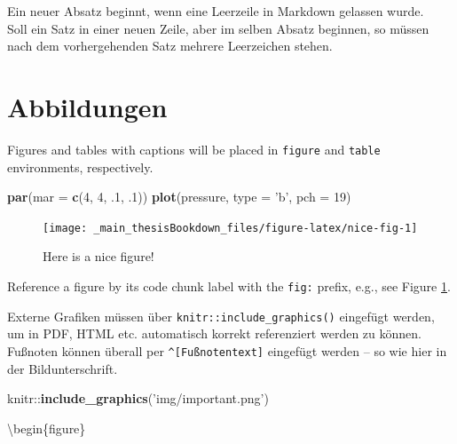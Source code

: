 \documentclass[]{book}
\makeatletter
\newenvironment{Shaded}{\begin{snugshade}}{\end{snugshade}}
\newcommand{\KeywordTok}[1]{\textcolor[rgb]{0.13,0.29,0.53}{\textbf{{#1}}}}
\newcommand{\DataTypeTok}[1]{\textcolor[rgb]{0.13,0.29,0.53}{{#1}}}
\newcommand{\DecValTok}[1]{\textcolor[rgb]{0.00,0.00,0.81}{{#1}}}
\newcommand{\StringTok}[1]{\textcolor[rgb]{0.31,0.60,0.02}{{#1}}}
\newcommand{\NormalTok}[1]{{#1}}
\newenvironment{kframe}{%
\medskip{}
\setlength{\fboxsep}{.8em}
 \def\at@end@of@kframe{}%
 \ifinner\ifhmode%
  \def\at@end@of@kframe{\end{minipage}}%
  \begin{minipage}{\columnwidth}%
 \fi\fi%
 \def\FrameCommand##1{\hskip\@totalleftmargin \hskip-\fboxsep
 \colorbox{shadecolor}{##1}\hskip-\fboxsep
     \hskip-\linewidth \hskip-\@totalleftmargin \hskip\columnwidth}%
 \MakeFramed {\advance\hsize-\width
   \@totalleftmargin\z@ \linewidth\hsize
   \@setminipage}}%
 {\par\unskip\endMakeFramed%
 \at@end@of@kframe}
\renewenvironment{Shaded}{\begin{kframe}}{\end{kframe}}
\theoremstyle{definition}
\theoremstyle{definition}
\theoremstyle{remark}
\makeatother
\begin{document}
Ein neuer Absatz beginnt, wenn eine Leerzeile in Markdown gelassen
wurde.\\
Soll ein Satz in einer neuen Zeile, aber im selben Absatz beginnen, so
müssen nach dem vorhergehenden Satz mehrere Leerzeichen stehen.

\section{Abbildungen}\label{abbildungen}

Figures and tables with captions will be placed in \texttt{figure} and
\texttt{table} environments, respectively.

\begin{Shaded}
\begin{Highlighting}[]
\KeywordTok{par}\NormalTok{(}\DataTypeTok{mar =} \KeywordTok{c}\NormalTok{(}\DecValTok{4}\NormalTok{, }\DecValTok{4}\NormalTok{, .}\DecValTok{1}\NormalTok{, .}\DecValTok{1}\NormalTok{))}
\KeywordTok{plot}\NormalTok{(pressure, }\DataTypeTok{type =} \StringTok{'b'}\NormalTok{, }\DataTypeTok{pch =} \DecValTok{19}\NormalTok{)}
\end{Highlighting}
\end{Shaded}

\begin{figure}

{\centering \texttt{[image: \_main\_thesisBookdown\_files/figure-latex/nice-fig-1]} 

}

\caption{Here is a nice figure!}\label{fig:nice-fig}
\end{figure}

Reference a figure by its code chunk label with the \texttt{fig:}
prefix, e.g., see Figure \ref{fig:nice-fig}.

Externe Grafiken müssen über \texttt{knitr::include\_graphics()}
eingefügt werden, um in PDF, HTML etc. automatisch korrekt referenziert
werden zu können. Fußnoten können überall per
\texttt{\^{}{[}Fußnotentext{]}} eingefügt werden -- so wie hier in der
Bildunterschrift.

\begin{Shaded}
\begin{Highlighting}[]
\NormalTok{knitr::}\KeywordTok{include_graphics}\NormalTok{(}\StringTok{'img/important.png'}\NormalTok{)}
\end{Highlighting}
\end{Shaded}

\textbackslash{}begin\{figure\}
\end{document}
